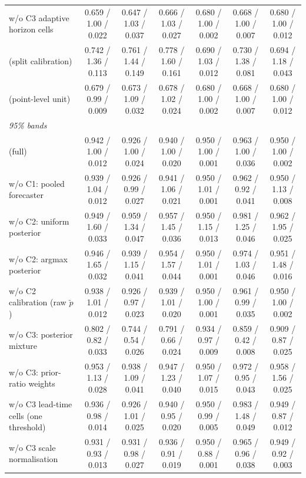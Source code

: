 \begin{table}[!htbp]
{\begin{tabular}{lcccccc}
w/o C3 adaptive horizon cells & 0.659 / 1.00 / 0.022 & 0.647 / 1.03 / 0.037 & 0.666 / 1.03 / 0.027 & 0.680 / 1.00 / 0.002 & 0.668 / 1.00 / 0.007 & 0.680 / 1.00 / 0.012 \\
\gamut{} (split calibration) & 0.742 / 1.36 / 0.113 & 0.761 / 1.44 / 0.149 & 0.778 / 1.60 / 0.161 & 0.690 / 1.03 / 0.012 & 0.730 / 1.38 / 0.081 & 0.694 / 1.18 / 0.043 \\
\gamut{} (point-level unit) & 0.679 / 0.99 / 0.009 & 0.673 / 1.09 / 0.032 & 0.678 / 1.02 / 0.024 & 0.680 / 1.00 / 0.002 & 0.668 / 1.00 / 0.007 & 0.680 / 1.00 / 0.012 \\
\midrule
\multicolumn{7}{l}{\textit{95\% bands}} \\
\midrule
\gamut{} (full) & 0.942 / 1.00 / 0.012 & 0.926 / 1.00 / 0.024 & 0.940 / 1.00 / 0.020 & 0.950 / 1.00 / 0.001 & 0.963 / 1.00 / 0.036 & 0.950 / 1.00 / 0.002 \\
w/o C1: pooled forecaster & 0.939 / 1.04 / 0.012 & 0.926 / 0.99 / 0.027 & 0.941 / 1.06 / 0.021 & 0.950 / 1.01 / 0.001 & 0.962 / 0.92 / 0.041 & 0.950 / 1.13 / 0.008 \\
w/o C2: uniform posterior & 0.949 / 1.60 / 0.033 & 0.959 / 1.34 / 0.047 & 0.957 / 1.45 / 0.036 & 0.950 / 1.15 / 0.013 & 0.981 / 1.25 / 0.046 & 0.962 / 1.95 / 0.025 \\
w/o C2: argmax posterior & 0.946 / 1.65 / 0.032 & 0.939 / 1.15 / 0.041 & 0.954 / 1.57 / 0.044 & 0.950 / 1.01 / 0.001 & 0.974 / 1.03 / 0.046 & 0.951 / 1.48 / 0.016 \\
w/o C2 calibration (raw $\tilde p$) & 0.938 / 1.01 / 0.012 & 0.926 / 0.97 / 0.023 & 0.939 / 1.01 / 0.020 & 0.950 / 1.00 / 0.001 & 0.961 / 0.99 / 0.035 & 0.950 / 1.00 / 0.002 \\
w/o C3: posterior mixture & 0.802 / 0.82 / 0.033 & 0.744 / 0.54 / 0.026 & 0.791 / 0.66 / 0.024 & 0.934 / 0.97 / 0.009 & 0.859 / 0.42 / 0.008 & 0.909 / 0.87 / 0.025 \\
w/o C3: prior-ratio weights & 0.953 / 1.13 / 0.028 & 0.938 / 1.09 / 0.041 & 0.947 / 1.23 / 0.040 & 0.950 / 1.07 / 0.015 & 0.972 / 0.95 / 0.043 & 0.958 / 1.56 / 0.025 \\
w/o C3 lead-time cells (one threshold) & 0.936 / 0.98 / 0.014 & 0.926 / 1.01 / 0.025 & 0.940 / 0.95 / 0.020 & 0.950 / 0.99 / 0.005 & 0.983 / 1.48 / 0.049 & 0.949 / 0.87 / 0.012 \\
w/o C3 scale normalisation & 0.931 / 0.93 / 0.013 & 0.931 / 0.98 / 0.027 & 0.936 / 0.91 / 0.019 & 0.950 / 0.88 / 0.001 & 0.965 / 0.96 / 0.038 & 0.949 / 0.92 / 0.003 \\

\end{tabular}}
\end{table}
